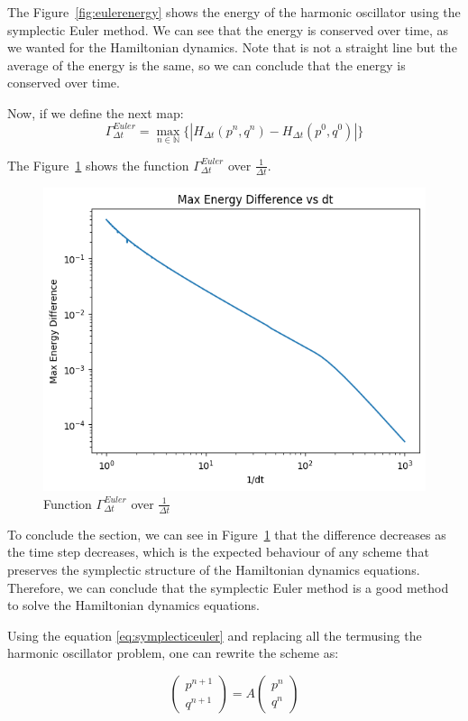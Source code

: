 \documentclass{article}
\begin{document}
The Figure~\ref{fig:eulerenergy} shows the energy of the harmonic oscillator using the symplectic Euler method. We can see that the energy is conserved over time, as we wanted for the Hamiltonian dynamics. Note that is not a straight line but the average of the energy is the same, so we can conclude that the energy is conserved over time.

Now, if we define the next map:
\[
	\Gamma_{\Delta t}^{Euler} = \max_{n \in \mathbb{N}}\{|H_{\Delta t}(p^n, q^n) - H_{\Delta t}(p^0, q^0)|\}
\]

The Figure~\ref*{fig:eulermaxenergy} shows the function \(\Gamma_{\Delta t}^{Euler}\) over \(\frac{1}{\Delta t}\).

\begin{figure}[H]
	\centering
	\includegraphics[width=0.5\linewidth]{./Figures/Sympletic/eulermaxenergy.png}
	\caption{Function \(\Gamma_{\Delta t}^{Euler}\) over \(\frac{1}{\Delta t}\)}
	\label{fig:eulermaxenergy}
\end{figure}

To conclude the section, we can see in Figure~\ref*{fig:eulermaxenergy} that the difference decreases as the time step decreases, which is the expected behaviour of any scheme that preserves the symplectic structure of the Hamiltonian dynamics equations. Therefore, we can conclude that the symplectic Euler method is a good method to solve the Hamiltonian dynamics equations.

\label{sec:linear_stability_symplectic_euler}

Using the equation \ref{eq:symplecticeuler} and replacing all the termusing the harmonic oscillator problem, one can rewrite the scheme as:

\[
	\begin{pmatrix} p^{n+1} \\ q^{n+1} \end{pmatrix} = A \begin{pmatrix} p^{n} \\ q^{n} \end{pmatrix}
\]
\end{document}
